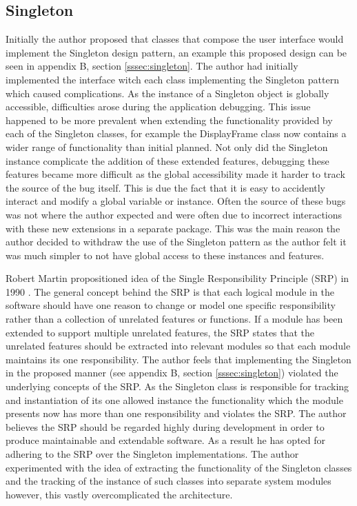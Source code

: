 \subsection{Singleton}

Initially the author proposed that classes that compose the user interface would implement the Singleton design pattern\cite{gof:design:singleton}, an example this proposed design can be seen in appendix B, section \ref{sssec:singleton}. The author had initially implemented the interface witch each class implementing the Singleton pattern which caused complications. As the instance of a Singleton object is globally accessible, difficulties arose during the application debugging. This issue happened to be more prevalent when extending the functionality provided by each of the Singleton classes, for example the DisplayFrame class now contains a wider range of functionality than initial planned. Not only did the Singleton instance complicate the addition of these extended features, debugging these features became more difficult as the global accessibility made it harder to track the source of the bug itself. This is due the fact that it is easy to accidently interact and modify a global variable or instance. Often the source of these bugs was not where the author expected and were often due to incorrect interactions with these new extensions in a separate package. This was the main reason the author decided to withdraw the use of the Singleton pattern as the author felt it was much simpler to not have global access to these instances and features.

Robert Martin propositioned idea of the Single Responsibility Principle (SRP) in 1990 \cite{SRP:site}. The general concept behind the SRP is that each logical module in the software should have one reason to change or model one specific responsibility rather than a collection of unrelated features or functions. If a module has been extended to support multiple unrelated features, the SRP states that the unrelated features should be extracted into relevant modules so that each module maintains its one responsibility. The author feels that implementing the Singleton in the proposed manner (see appendix B, section \ref{sssec:singleton}) violated the underlying concepts of the SRP. As the Singleton class is responsible for tracking and instantiation of its one allowed instance the functionality which the module presents now has more than one responsibility and violates the SRP. The author believes the SRP should be regarded highly during development in order to produce maintainable and extendable software. As a result he has opted for adhering to the SRP over the Singleton implementations. The author experimented with the idea of extracting the functionality of the Singleton classes and the tracking of the instance of such classes into separate system modules however, this vastly overcomplicated the architecture.

